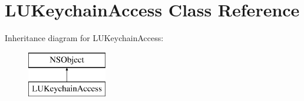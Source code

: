 \hypertarget{interface_l_u_keychain_access}{}\section{L\+U\+Keychain\+Access Class Reference}
\label{interface_l_u_keychain_access}
Inheritance diagram for L\+U\+Keychain\+Access\+:\begin{figure}[H]
\begin{center}
\leavevmode
\includegraphics[height=2.000000cm]{interface_l_u_keychain_access}
\end{center}
\end{figure}
